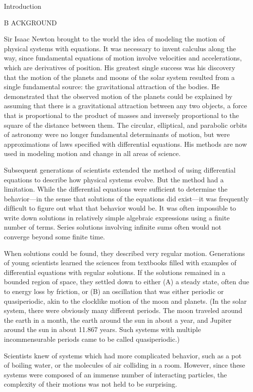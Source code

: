 Introduction

B ACKGROUND

Sir Isaac Newton brought to the world the idea of modeling the motion of physical systems with equations. 
It was necessary to invent calculus along the way, since fundamental equations of motion involve velocities 
and accelerations, which are derivatives of position. His greatest single success was his discovery that 
the motion of the planets and moons of the solar system resulted from a single fundamental source: the 
gravitational attraction of the bodies. He demonstrated that the observed motion of the planets could be 
explained by assuming that there is a gravitational attraction between any two objects, a force that is 
proportional to the product of masses and inversely proportional to the square of the distance between 
them. The circular, elliptical, and parabolic orbits of astronomy were no longer fundamental determinants 
of motion, but were approximations of laws speciﬁed with differential 
equations. His methods are now used in modeling motion and change in all areas of science.

Subsequent generations of scientists extended the method of using differential equations to describe how 
physical systems evolve. But the method had a limitation. While the differential equations were sufﬁcient 
to determine the behavior—in the sense that solutions of the equations did exist—it was frequently 
difﬁcult to ﬁgure out what that behavior would be. It was often impossible to write down solutions in 
relatively simple algebraic expressions using a ﬁnite number of terms. Series solutions involving inﬁnite 
sums often would not converge beyond some ﬁnite time.

When solutions could be found, they described very regular motion. Generations of young scientists learned 
the sciences from textbooks ﬁlled with examples of differential equations with regular solutions. If the 
solutions remained in a bounded region of space, they settled down to either (A) a steady state, often due 
to energy loss by friction, or (B) an oscillation that was either periodic or quasiperiodic, akin to the 
clocklike motion of the moon and planets. (In the solar system, there were obviously many different 
periods. The moon traveled around the earth in a month, the earth around the sun in about a year, and 
Jupiter around the sun in about 11.867 years. Such systems with multiple incommensurable periods came to be 
called quasiperiodic.)

Scientists knew of systems which had more complicated behavior, such as a pot of boiling water, or the 
molecules of air colliding in a room. However, since these systems were composed of an immense number of 
interacting particles, the complexity of their motions was not held to be surprising.

